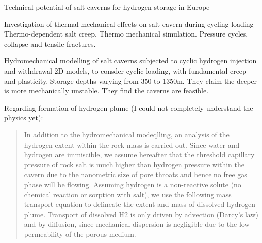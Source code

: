 \begin{frame}{\cite{caglayan2020}Technical potential of salt caverns for hydrogen storage in Europe}
\end{frame}


\begin{frame}{\cite{li2021investigation} Investigation of thermal-mechanical effects on salt cavern during cycling loading}
Thermo-dependent salt creep. Thermo mechanical simulation. Pressure cycles, collapse and tensile fractures.
\end{frame}

\begin{frame}[shrink=30,fragile]{\cite{coarita23} Hydromechanical modelling of salt caverns subjected to cyclic hydrogen injection and withdrawal}
2D models, to consder cyclic loading, with fundamental creep and plasticity. Storage depths varying from 350 to 1350m. They claim the deeper is more mechanically unstable. They find the caverns are feasible.

Regarding formation of hydrogen plume (I could not completely understand the physics yet):
\begin{quote}
In addition to the hydromechanical modeqlling, an analysis of the
hydrogen extent within the rock mass is carried out. Since water and
hydrogen are immiscible, we assume hereafter that the threshold
capillary pressure of rock salt is much higher than hydrogen pressure
within the cavern due to the nanometric size of pore throats and hence
no free gas phase will be flowing. Assuming hydrogen is a non-reactive
solute (no chemical reaction or sorption with salt), we use the following
mass transport equation to delineate the extent and mass of dissolved
hydrogen plume. Transport of dissolved H2 is only driven by advection
(Darcy’s law) and by diffusion, since mechanical dispersion is negligible
due to the low permeability of the porous medium.
\end{quote}
\end{frame}

